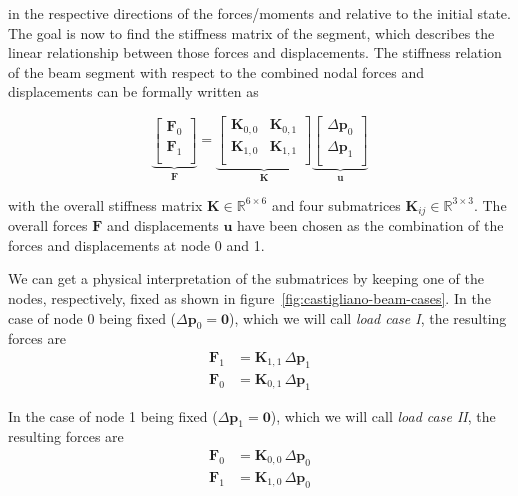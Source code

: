 in the respective directions of the forces/moments and relative to the initial state.
The goal is now to find the stiffness matrix of the segment, which describes the linear relationship between those forces and displacements.
The stiffness relation of the beam segment with respect to the combined nodal forces and displacements can be formally written as

\begin{equation}
\underbrace{
\begin{bmatrix}
\boldsymbol{F}_0 \\
\boldsymbol{F}_1 \\
\end{bmatrix}
}_{\boldsymbol{F}}
=
\underbrace{
\begin{bmatrix}
\boldsymbol{K}_{0,0} & \boldsymbol{K}_{0,1} \\
\boldsymbol{K}_{1,0} & \boldsymbol{K}_{1,1} \\
\end{bmatrix}
}_{\boldsymbol{K}}
\underbrace{
\begin{bmatrix}
\Delta\boldsymbol{p}_0 \\
\Delta\boldsymbol{p}_1 \\
\end{bmatrix}
}_{\boldsymbol{u}}
\end{equation}

with the overall stiffness matrix $\boldsymbol{K} \in \mathbb{R}^{6 \times 6}$ and four submatrices $\boldsymbol{K}_{ij} \in \mathbb{R}^{3 \times 3}$.
The overall forces $\boldsymbol{F}$ and displacements $\boldsymbol{u}$ have been chosen as the combination of the forces and displacements at node 0 and 1.

We can get a physical interpretation of the submatrices by keeping one of the nodes, respectively, fixed as shown in figure~\ref{fig:castigliano-beam-cases}.
In the case of node 0 being fixed ($\Delta\boldsymbol{p}_{0} = \boldsymbol{0}$), which we will call \textit{load case I}, the resulting forces are
%
\begin{align}
\boldsymbol{F}_1 &= \boldsymbol{K}_{1,1}\,\Delta\boldsymbol{p}_1 \\
\boldsymbol{F}_0 &= \boldsymbol{K}_{0,1}\,\Delta\boldsymbol{p}_1
\end{align}

In the case of node 1 being fixed ($\Delta\boldsymbol{p}_{1} = \boldsymbol{0}$), which we will call \textit{load case II}, the resulting forces are
%
\begin{align}
\boldsymbol{F}_0 &= \boldsymbol{K}_{0,0}\,\Delta\boldsymbol{p}_0 \\
\boldsymbol{F}_1 &= \boldsymbol{K}_{1,0}\,\Delta\boldsymbol{p}_0
\end{align}

